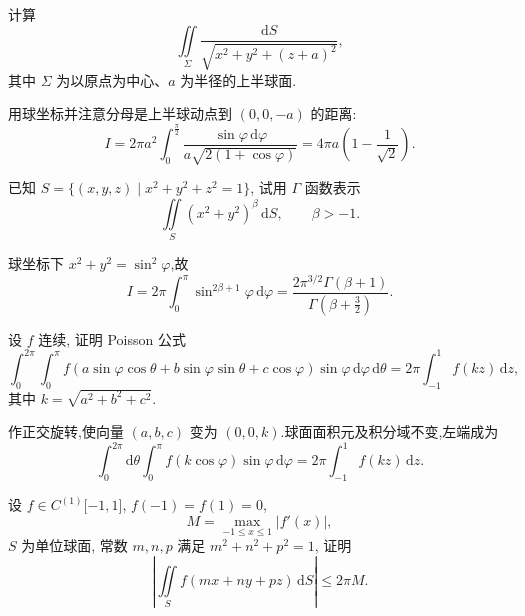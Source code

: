 \begin{example}
    计算
    \[
        \iint\limits_\Sigma\dfrac{\mathrm{d}S}{\sqrt{x^2+y^2+(z+a)^2}},
    \]
    其中 $\Sigma$ 为以原点为中心、$a$ 为半径的上半球面.
\end{example}
\exampleblank

\begin{solution}
    用球坐标并注意分母是上半球动点到 $(0,0,-a)$ 的距离:
    \[
        I=2\pi a^2\int_0^{\frac{\pi}{2}}\dfrac{\sin\varphi\,\mathrm{d}\varphi}{a\sqrt{2(1+\cos\varphi)}}
        =4\pi a\left(1-\dfrac{1}{\sqrt{2}}\right).
    \]
\end{solution}

\begin{example}
    已知 $S=\{(x,y,z)\mid x^2+y^2+z^2=1\}$, 试用 $\Gamma$ 函数表示
    \[
        \iint\limits_S(x^2+y^2)^\beta\,\mathrm{d}S,
        \qquad \beta>-1.
    \]
\end{example}
\exampleblank

\begin{solution}
    球坐标下 $x^2+y^2=\sin^2\varphi$,故
    \[
        I=2\pi\int_0^\pi\sin^{2\beta+1}\varphi\,\mathrm{d}\varphi
        =\dfrac{2\pi^{3/2}\Gamma(\beta+1)}{\Gamma(\beta+\frac{3}{2})}.
    \]
\end{solution}

\begin{example}
    设 $f$ 连续, 证明 Poisson 公式
    \[
        \int_0^{2\pi}\int_0^\pi
        f(a\sin\varphi\cos\theta+b\sin\varphi\sin\theta+c\cos\varphi)
        \sin\varphi\,\mathrm{d}\varphi\,\mathrm{d}\theta
        =2\pi\int_{-1}^1f(kz)\,\mathrm{d}z,
    \]
    其中 $k=\sqrt{a^2+b^2+c^2}$.
\end{example}
\exampleblank

\begin{solution}
    作正交旋转,使向量 $(a,b,c)$ 变为 $(0,0,k)$.球面面积元及积分域不变,左端成为
    \[
        \int_0^{2\pi}\!\mathrm{d}\theta\int_0^\pi f(k\cos\varphi)\sin\varphi\,\mathrm{d}\varphi
        =2\pi\int_{-1}^1f(kz)\,\mathrm{d}z.
    \]
\end{solution}

\begin{example}
    设 $f\in C^{(1)}\lbrack-1,1\rbrack$, $f(-1)=f(1)=0$,
    \[
        M=\max_{-1\leq x\leq1}|f'(x)|,
    \]
    $S$ 为单位球面, 常数 $m,n,p$ 满足 $m^2+n^2+p^2=1$, 证明
    \[
        \left|\iint\limits_Sf(mx+ny+pz)\,\mathrm{d}S\right|\leq2\pi M.
    \]
\end{example}
\exampleblank

